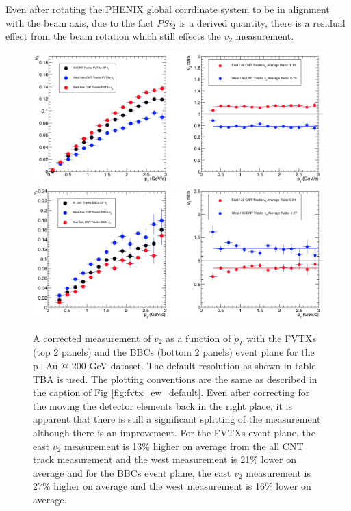 Even after rotating the PHENIX global corrdinate system to be in alignment with the beam axis, due to the fact $PSi_2$ is a derived quantity, there is a residual effect from the beam rotation which still effects the $v_2$ measurement.



\begin{figure}[!h]
\begin{center}
\includegraphics[width=0.85\linewidth]{figs/fvtx_vertex_rot_only.png}
\includegraphics[width=0.85\linewidth]{figs/bbc_vertex_rot_only.png}
\caption{A corrected measurement of $v_{2}$ as a function of $p_T$ with the FVTXs (top 2 panels) and the BBCs (bottom 2 panels) event plane for the p+Au @ 200 GeV dataset. The default resolution as shown in table TBA is used. The plotting conventions are the same as described in the caption of Fig \ref{fig:fvtx_ew_default}. Even after correcting for the moving the detector elements back in the right place, it is apparent that there is still a significant splitting of the measurement although there is an improvement. For the FVTXs event plane, the east $v_2$ measurement is 13$\%$ higher on average from the all CNT track measurement and the west measurement is 21$\%$ lower on average and for the BBCs event plane, the east $v_2$ measurement is 27$\%$ higher on average and the west measurement is 16$\%$ lower on average.}
\label{fig:fvtx_ew_rot}
\end{center}
\end{figure}


